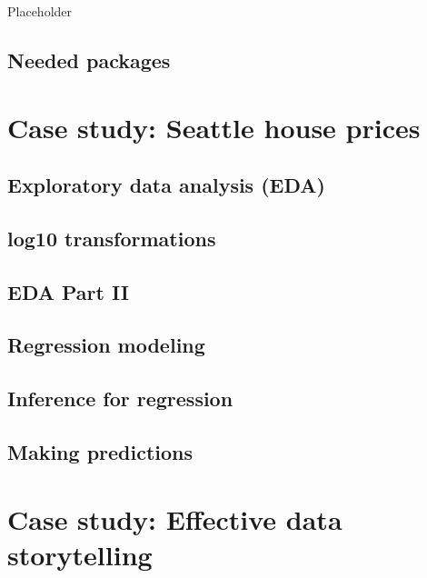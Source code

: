 \documentclass[
  12pt, krantz2,
]{krantz}
\begin{document}
Placeholder

\hypertarget{needed-packages-9}{%
\subsection*{Needed packages}\label{needed-packages-9}}


\hypertarget{seattle-house-prices}{%
\section{Case study: Seattle house prices}\label{seattle-house-prices}}

\hypertarget{house-prices-EDA-I}{%
\subsection{Exploratory data analysis (EDA)}\label{house-prices-EDA-I}}

\hypertarget{log10-transformations}{%
\subsection{log10 transformations}\label{log10-transformations}}

\hypertarget{eda-part-ii}{%
\subsection{EDA Part II}\label{eda-part-ii}}

\hypertarget{house-prices-regression}{%
\subsection{Regression modeling}\label{house-prices-regression}}

\hypertarget{house-prices-inference-for-regression}{%
\subsection{Inference for regression}\label{house-prices-inference-for-regression}}

\hypertarget{house-prices-making-predictions}{%
\subsection{Making predictions}\label{house-prices-making-predictions}}

\hypertarget{data-journalism}{%
\section{Case study: Effective data storytelling}\label{data-journalism}}
\end{document}
